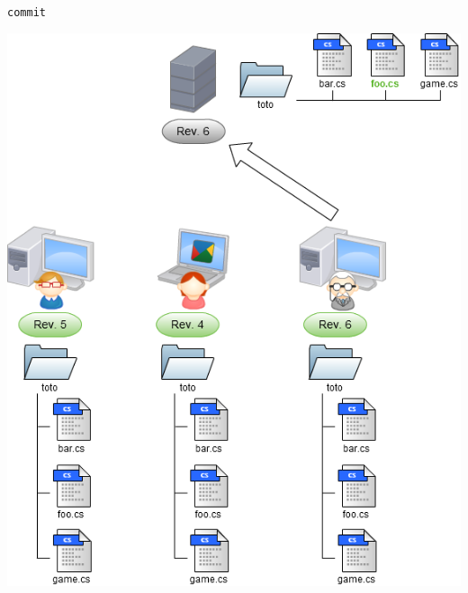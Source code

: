 \begin{frame}
  \texttt{commit}
  \begin{center}
    \vspace{-12pt}
    \includegraphics[scale=0.3]{images/6-Commit2.png}
  \end{center}
\end{frame}

